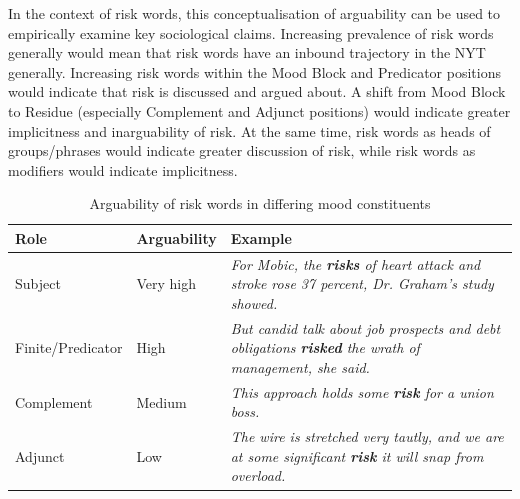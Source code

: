 

In the context of risk words, this conceptualisation of arguability can be used to empirically examine key sociological claims. Increasing prevalence of risk words generally would mean that risk words have an inbound trajectory in the NYT generally. Increasing risk words within the Mood Block and Predicator positions would indicate that risk is discussed and argued about. A shift from Mood Block to Residue (especially Complement and Adjunct positions) would indicate greater implicitness and inarguability of risk. At the same time, risk words as heads of groups/phrases would indicate greater discussion of risk, while risk words as modifiers would indicate implicitness.

\begin{table}
\centering
\footnotesize
\begin{tabularx}{.70\textwidth}{L{.50}L{.50}L{2}}%
\toprule
\textbf{Role}              & \textbf{Arguability} & \textbf{Example} \\ \midrule
Subject           & Very high   & \emph{For Mobic, the \textbf{risks} of heart attack and stroke rose 37 percent, Dr. Graham's study showed.}       \\ 
Finite\slash Predicator & High        & \emph{But candid talk about job prospects and debt obligations \textbf{risked} the wrath of management, she said.}       \\ 
Complement        & Medium      & \emph{This approach holds some \textbf{risk} for a union boss.}       \\ 
Adjunct           & Low         & \emph{The wire is stretched very tautly, and we are at some significant \textbf{risk} it will snap from overload.}       \\ \bottomrule
\end{tabularx}
\caption{Arguability of risk words in differing mood constituents}
\end{table}

